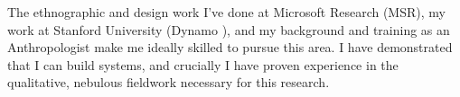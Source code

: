 \documentclass[12pt]{article}
\newcommand{\sectitle}[1]{\textbf{\MakeUppercase{#1}}}
\begin{document}
The ethnographic and design work I've done at Microsoft Research (MSR),
my work at Stanford University (Dynamo
\cite{dynamo}),
and my background and training as an Anthropologist
make me ideally skilled to pursue this area.
I have demonstrated that I can build systems,
and crucially I have proven experience in the qualitative,
nebulous fieldwork necessary for this research.



\renewcommand\refname{\sectitle{references}}
% 

{\footnotesize

}
\end{document}
